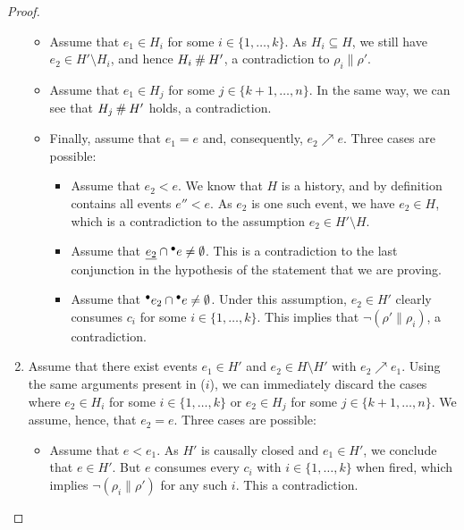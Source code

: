 \documentclass[12pt,a4paper]{article}
\newcommand{\confl}{\ensuremath\mathbin\#}
\begin{document}
\begin{proof}
\begin{enumerate}[$i$.]
\begin{itemize}
\item Assume that $e_1 \in H_i$ for some $i \in \{1, \ldots, k\}$. As $H_i
\subseteq H$, we still have $e_2 \in H' \setminus H_i$, and hence $H_i \confl
H'$, a contradiction to $\rho_i \parallel \rho'$.

\item Assume that $e_1 \in H_j$ for some $j \in \{k+1, \ldots, n\}$.  In
the same way, we can see that $H_j \confl H'$ holds, a contradiction.

\item Finally, assume that $e_1 = e$ and, consequently, $e_2 \nearrow e$.
Three cases are possible:

\begin{itemize}
\item Assume that $e_2 < e$.  We know that $H$ is a history, and by definition
contains all events $e'' < e$.  As $e_2$ is one such event, we have $e_2 \in
H$, which is a contradiction to the assumption $e_2 \in H' \setminus H$.

\item Assume that $\underline{e_2} \cap {}^\bullet e \ne \emptyset$.  This is a
contradiction to the last conjunction in the hypothesis of the statement that
we are proving.

\item Assume that ${}^\bullet e_2 \cap {}^\bullet e \ne \emptyset$.  Under this
assumption, $e_2 \in H'$ clearly consumes $c_i$ for some $i \in \{1, \ldots,
k\}$.  This implies that $\lnot (\rho' \parallel \rho_i)$, a contradiction.
\end{itemize}
\end{itemize}

\item Assume that there exist events $e_1 \in H'$ and $e_2 \in H \setminus H'$
with $e_2 \nearrow e_1$.  Using the same arguments present in ($i$), we can
immediately discard the cases where $e_2 \in H_i$ for some $i \in \{1, \ldots,
k\}$ or $e_2 \in H_j$ for some $j \in \{k+1, \ldots, n\}$.  We assume, hence,
that $e_2 = e$.  Three cases are possible:

\begin{itemize}
\item Assume that $e < e_1$.  As $H'$ is causally closed and $e_1 \in H'$, we
conclude that $e \in H'$.  But $e$ consumes every $c_i$ with $i \in \{1,
\ldots, k\}$ when fired, which implies $\lnot (\rho_i \parallel \rho')$ for any
such $i$.  This a contradiction.


\end{itemize}
\end{enumerate}
\end{proof}
\end{document}
